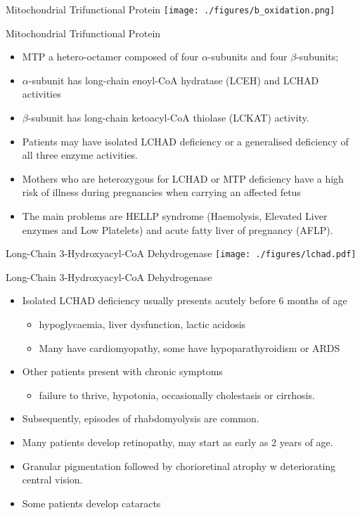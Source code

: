 \documentclass[presentation, smaller]{beamer}
\begin{document}
\begin{frame}[label={sec:orgheadline16}]{Mitochondrial Trifunctional Protein}
\texttt{[image: ./figures/b\_oxidation.png]}
\end{frame}
\begin{frame}[label={sec:orgheadline17}]{Mitochondrial Trifunctional Protein}
\begin{itemize}
\item MTP a hetero-octamer composed of four \(\alpha\)-subunits and four \(\beta\)-subunits;
\item \(\alpha\)-subunit has long-chain enoyl-CoA hydratase (LCEH) and LCHAD activities
\item \(\beta\)-subunit has long-chain ketoacyl-CoA thiolase (LCKAT) activity.
\item Patients may have isolated LCHAD deficiency or a generalised deficiency of all three enzyme activities.

\item Mothers who are heterozygous for LCHAD or MTP deficiency have a high
risk of illness during pregnancies when carrying an affected fetus
\item The main problems are HELLP syndrome (Haemolysis, Elevated Liver
enzymes and Low Platelets) and acute fatty liver of pregnancy
(AFLP).
\end{itemize}
\end{frame}

\begin{frame}[label={sec:orgheadline18}]{Long-Chain 3-Hydroxyacyl-CoA Dehydrogenase}
\texttt{[image: ./figures/lchad.pdf]}
\end{frame}
\begin{frame}[label={sec:orgheadline19}]{Long-Chain 3-Hydroxyacyl-CoA Dehydrogenase}
\begin{itemize}
\item Isolated LCHAD deficiency usually presents acutely before 6 months of age
\begin{itemize}
\item hypoglycaemia, liver dysfunction, lactic acidosis
\item Many have cardiomyopathy, some have hypoparathyroidism or ARDS
\end{itemize}
\item Other patients present with chronic symptoms
\begin{itemize}
\item failure to thrive, hypotonia, occasionally cholestasis or cirrhosis.
\end{itemize}
\item Subsequently, episodes of rhabdomyolysis are common.
\item Many patients develop retinopathy, may start as early as 2 years of age.
\item Granular pigmentation followed by chorioretinal atrophy w deteriorating central vision.
\item Some patients develop cataracts
\end{itemize}
\end{frame}
\end{document}

